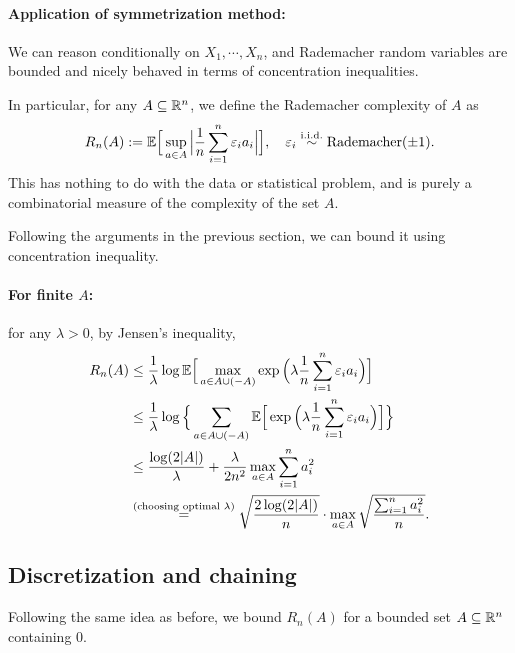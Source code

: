 \documentclass[11pt,letterpaper]{article}
\numberwithin{theorem}{lecture}
\numberwithin{proposition}{lecture}
\numberwithin{lemma}{lecture}
\numberwithin{claim}{lecture}
\numberwithin{corollary}{lecture}
\numberwithin{definition}{lecture}
\numberwithin{conjecture}{lecture}
\numberwithin{remark}{lecture}
\numberwithin{example}{lecture}
\numberwithin{equation}{lecture}
\begin{document}
\paragraph{Application of symmetrization method:} We can reason conditionally on $X_1, \cdots, X_n$, and Rademacher random variables are bounded and nicely behaved in terms of concentration inequalities.

In particular, for any $A \subseteq \mathbb{R}^n$, we define the Rademacher complexity of $A$ as
\begin{align*}
  R_n (A) := {\mathbb{E}} \Big[ \sup_{a \in A} \Big| \frac{1}{n} \sum_{i = 1}^n \varepsilon_i a_i \Big| \Big], \quad \varepsilon_i \overset{\mathrm{i.i.d.}}{\sim} \mathrm{Rademacher} (\pm 1).
\end{align*}
This has nothing to do with the data or statistical problem, and is purely a combinatorial measure of the complexity of the set $A$.

Following the arguments in the previous section, we can bound it using concentration inequality.

\paragraph{For finite $A$:} for any $\lambda > 0$, by Jensen's inequality,
\begin{align*}
  R_n (A) &\leq \frac{1}{\lambda} \log {\mathbb{E}} \Big[ \max_{a \in A \cup (- A)} \exp \Big( \lambda  \frac{1}{n} \sum_{i = 1}^n \varepsilon_i a_i  \Big) \Big]\\
  &\leq \frac{1}{\lambda}  \log \Big\{ \sum_{a \in A \cup (-A)} {\mathbb{E}} \Big[  \exp \Big( \lambda  \frac{1}{n} \sum_{i = 1}^n \varepsilon_i a_i  \Big) \Big] \Big\}\\
  &\leq \frac{\log (2 |A|)}{\lambda} + \frac{\lambda}{2 n^2} \max_{a \in A} \sum_{i = 1}^n a_i^2\\
  &\overset{\text{(choosing optimal $\lambda$)}}{=} \sqrt{\frac{2 \log (2 |A|)}{n}} \cdot \max_{a \in A} \sqrt{\frac{\sum_{i = 1}^n a_i^2}{n}}.
\end{align*}

\subsection{Discretization and chaining}
Following the same idea as before, we bound $R_n (A)$ for a bounded set $A \subseteq \mathbb{R}^n$ containing $0$.
\end{document}

